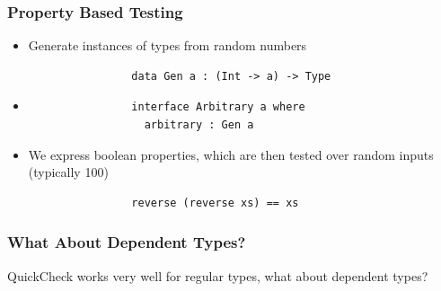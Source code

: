 \documentclass[compress]{beamer}
\begin{document}
\begin{frame}[fragile]
  \frametitle{Property Based Testing}

  \large

  \begin{itemize}
    \item<1-> Generate instances of types from random numbers
              \begin{verbatim}
                data Gen a : (Int -> a) -> Type
              \end{verbatim}
    \item<2-> \begin{verbatim}
                interface Arbitrary a where
                  arbitrary : Gen a
              \end{verbatim}
    \item<3-> We express boolean properties, which are then tested over random
              inputs (typically 100)
              \begin{verbatim}
                reverse (reverse xs) == xs
              \end{verbatim}
  \end{itemize}

\end{frame}


\begin{frame}
  \frametitle{What About Dependent Types?}

  \large

  \begin{center}
    QuickCheck works very well for regular types, what about dependent types?
  \end{center}

\end{frame}
\end{document}
